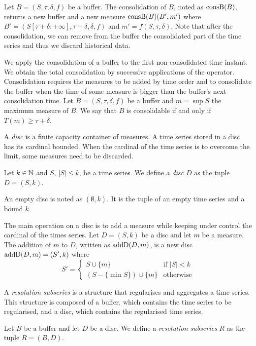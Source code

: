 Let $B=(S,\tau,\delta,f)$ be a buffer. The consolidation of $B$, noted
as $\operatorname{consB}(B)$, returns a new buffer and a new measure $\operatorname{consB}(B)
(B',m')$ where $ B'= (S[\tau+\delta:+\infty], \tau+\delta,\delta,f)$
and $m' = f(S,\tau,\delta)$. Note that after the consolidation, we can
remove from the buffer the consolidated part of the time series and
thus we discard historical data.

We apply the consolidation of a buffer to the first non-consolidated
time instant. We obtain the total consolidation by successive
applications of the operator. Consolidation requires the measures to
be added by time order and to consolidate the buffer when the time of
some measure is bigger than the buffer's next consolidation time.  Let
$B=(S,\tau,\delta,f)$ be a buffer and $m=\sup S$ the maximum measure
of $B$. We say that $B$ is consolidable if and only if $T(m) \geq
\tau+\delta$.

A \emph{disc} is a finite capacity container of measures. A time
series stored in a disc has its cardinal bounded. When the cardinal of
the time series is to overcome the limit, some measures need to be
discarded.

\begin{definition}[Disc]
  Let $k\in\mathbb{N}$ and $S$, $|S|\leq k$, be a time series. We define a
  \emph{disc} $D$ as the tuple $D=(S,k)$.
\end{definition}

An empty disc is noted as $(\emptyset,k)$. It is the tuple of an empty
time series and a bound $k$.

The main operation on a disc is to add a measure while keeping under
control the cardinal of the times series. Let $D=(S,k)$ be a disc and
let $m$ be a measure.  The addition of $m$ to $D$, written as
$\operatorname{addD}(D,m)$, is a new disc $\operatorname{addD}(D,m)=(S',k)$ where
\[
S' = \begin{cases}
  S\cup\{m\}                 & \text{if } |S|<k  \\
  (S-\{\min S\}) \cup \{m\} & \text{otherwise}
\end{cases}  
\]

A \emph{resolution subseries} is a structure that regularises and
aggregates a time series. This structure is composed of a buffer,
which contains the time series to be regularised, and a disc, which
contains the regularised time series.

\begin{definition}
  Let $B$ be a buffer and let $D$ be a disc.  We define a
  \emph{resolution subseries} $R$ as the tuple $R=(B,D)$.
\end{definition}
 
